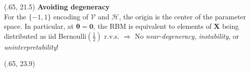 \documentclass[extrafontsizes, 30pt]{memoir}
\begin{document}
\begin{textblock}{14}(.65, 21.5)
{\large \bfseries Avoiding degeneracy} \\[-.75cm]

For the $\{-1, 1 \}$ encoding of $\mathcal{V}$ and $\mathcal{H}$, the origin is the center of the parameter space. In particular, at $\boldsymbol \theta = \boldsymbol 0$, the RBM is equivalent to elements of $\boldsymbol X$ being distributed as iid Bernoulli$\left(\frac{1}{2}\right)$ r.v.s. $\Rightarrow$ No \emph{near-degeneracy}, \emph{instability}, or \emph{uninterpretability}!
\end{textblock}
\begin{textblock}{14.5}(.65, 23.9)
\begin{minipage}{.42\textwidth}
\begin{figure}[ht]
  \begin{minipage}{0.49\textwidth}
  \end{minipage}
  \begin{minipage}{0.49\textwidth}
\end{minipage}
\end{figure}
\end{minipage}
\end{textblock}
\end{document}
